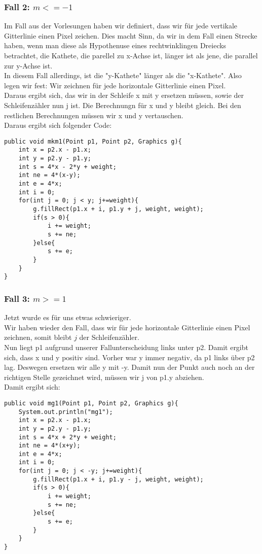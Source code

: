 \documentclass[a4paper,10pt]{article}
\begin{document}
\subsubsection{Fall 2: $m <= -1$}
Im Fall aus der Vorlesungen haben wir definiert, dass wir für jede vertikale Gitterlinie einen Pixel zeichen. Dies macht Sinn, da wir in dem Fall einen Strecke haben, wenn man diese als Hypothenuse eines rechtwinklingen Dreiecks betrachtet, die Kathete, die parellel zu x-Achse ist, länger ist als jene, die parallel zur y-Achse ist.\\
In diesem Fall allerdings, ist die "y-Kathete" länger als die "x-Kathete". Also legen wir fest: Wir zeichnen für jede horizontale Gitterlinie einen Pixel.\\
Daraus ergibt sich, das wir in der Schleife x mit y ersetzen müssen, sowie der Schleifenzähler nun j ist. Die Berechnungn für x und y bleibt gleich. Bei den restlichen Berechnungen müssen wir x und y vertauschen.\\Daraus ergibt sich folgender Code:
\begin{lstlisting}
public void mkm1(Point p1, Point p2, Graphics g){
    int x = p2.x - p1.x;
    int y = p2.y - p1.y;
    int s = 4*x - 2*y + weight;
    int ne = 4*(x-y);
    int e = 4*x;
    int i = 0;
    for(int j = 0; j < y; j+=weight){
        g.fillRect(p1.x + i, p1.y + j, weight, weight);
        if(s > 0){
            i += weight;
            s += ne;
        }else{
            s += e;
        }
    }
}
\end{lstlisting}
\subsubsection{Fall 3: $m >= 1$}
Jetzt wurde es für uns etwas schwieriger.\\Wir haben wieder den Fall, dass wir für jede horizontale Gitterlinie einen Pixel zeichnen, somit bleibt $j$ der Schleifenzähler.\\ Nun liegt p1 aufgrund unserer Fallunterscheidung links unter p2. Damit ergibt sich, dass x und y positiv sind. Vorher war y immer negativ, da p1 links über p2 lag. Deswegen ersetzen wir alle y mit -y. Damit nun der Punkt auch noch an der richtigen Stelle gezeichnet wird, müssen wir j von p1.y abziehen.\\Damit ergibt sich:
\begin{lstlisting}
public void mg1(Point p1, Point p2, Graphics g){
    System.out.println("mg1");
    int x = p2.x - p1.x;
    int y = p2.y - p1.y;
    int s = 4*x + 2*y + weight;
    int ne = 4*(x+y);
    int e = 4*x;
    int i = 0;
    for(int j = 0; j < -y; j+=weight){
        g.fillRect(p1.x + i, p1.y - j, weight, weight);
        if(s > 0){
            i += weight;
            s += ne;
        }else{
            s += e;
        }
    }
}
\end{lstlisting}
\end{document}
